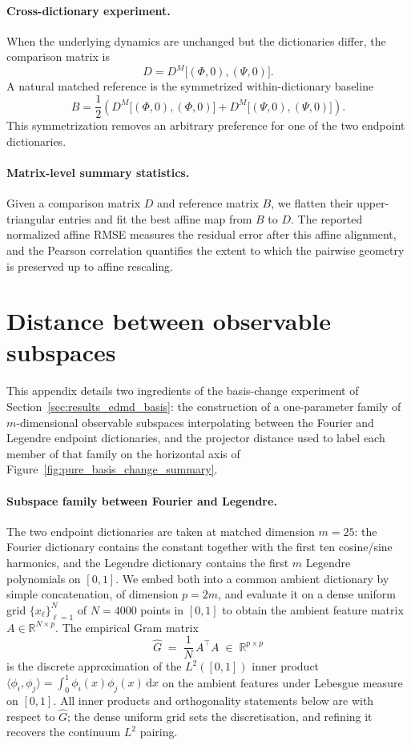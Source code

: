 \documentclass{article}
\theoremstyle{definition}
\begin{document}
\paragraph{Cross-dictionary experiment.}
When the underlying dynamics are unchanged but the dictionaries differ, the comparison matrix is
\[
D
=
D^{M}\bigl[(\Phi,0),(\Psi,0)\bigr].
\]
A natural matched reference is the symmetrized within-dictionary baseline
\[
B
=
\frac12\left(
D^{M}\bigl[(\Phi,0),(\Phi,0)\bigr]
+
D^{M}\bigl[(\Psi,0),(\Psi,0)\bigr]
\right).
\]
This symmetrization removes an arbitrary preference for one of the two endpoint dictionaries.

\paragraph{Matrix-level summary statistics.}
Given a comparison matrix \(D\) and reference matrix \(B\), we flatten their upper-triangular entries and fit the best affine map from \(B\) to \(D\). The reported normalized affine RMSE measures the residual error after this affine alignment, and the Pearson correlation quantifies the extent to which the pairwise geometry is preserved up to affine rescaling.



\section{Distance between observable subspaces}
\label{app:basis_distance}

This appendix details two ingredients of the basis-change experiment of
Section~\ref{sec:results_edmd_basis}: the construction of a one-parameter family of
$m$-dimensional observable subspaces interpolating between the Fourier and
Legendre endpoint dictionaries, and the projector distance used to label
each member of that family on the horizontal axis of
Figure~\ref{fig:pure_basis_change_summary}.

\paragraph{Subspace family between Fourier and Legendre.}
The two endpoint dictionaries are taken at matched dimension $m=25$: the
Fourier dictionary contains the constant together with the first ten
cosine/sine harmonics, and the Legendre dictionary contains the first $m$
Legendre polynomials on $[0,1]$.  We embed both into a common ambient
dictionary by simple concatenation, of dimension $p=2m$, and evaluate it
on a dense uniform grid $\{x_\ell\}_{\ell=1}^N$ of $N=4000$ points in
$[0,1]$ to obtain the ambient feature matrix
$A\in\mathbb R^{N\times p}$. The empirical Gram matrix
\begin{equation}\label{eq:emp_gram}
\hat G \;=\; \frac{1}{N}\,A^\top A \;\in\;\mathbb R^{p\times p}
\end{equation}
is the discrete approximation of the $L^2([0,1])$ inner product
$\langle \phi_i,\phi_j\rangle = \int_0^1 \phi_i(x)\phi_j(x)\,\mathrm dx$
on the ambient features under Lebesgue measure on $[0,1]$.  All inner
products and orthogonality statements below are with respect to $\hat
G$; the dense uniform grid sets the discretisation, and refining it
recovers the continuum $L^2$ pairing.
\end{document}
